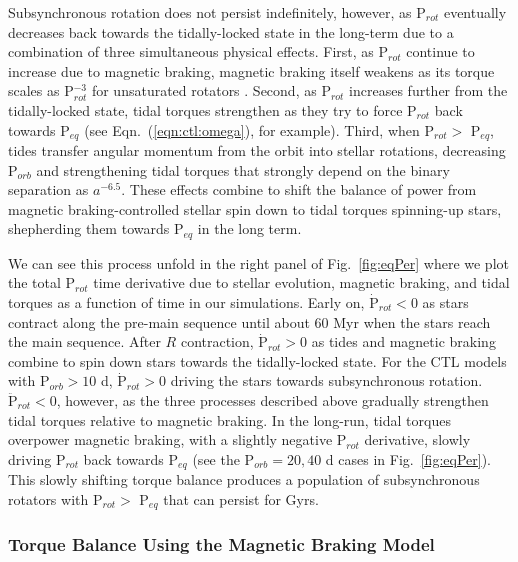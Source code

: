 \documentclass[twocolumn]{aastex61}
\begin{document}
Subsynchronous rotation does not persist indefinitely, however, as P$_{rot}$ eventually decreases back towards the tidally-locked state in the long-term due to a combination of three simultaneous physical effects.  First, as P$_{rot}$ continue to increase due to magnetic braking, magnetic braking itself weakens as its torque scales as P$_{rot}^{-3}$ for unsaturated rotators \citep{Matt2015}.  Second, as P$_{rot}$ increases further from the tidally-locked state, tidal torques strengthen as they try to force P$_{rot}$ back towards P$_{eq}$ (see Eqn.~(\ref{eqn:ctl:omega}), for example). Third, when P$_{rot} > $ P$_{eq}$, tides transfer angular momentum from the orbit into stellar rotations, decreasing P$_{orb}$ and strengthening tidal torques that strongly depend on the binary separation as $a^{-6.5}$.  These effects combine to shift the balance of power from magnetic braking-controlled stellar spin down to tidal torques spinning-up stars, shepherding them towards P$_{eq}$ in the long term. 

We can see this process unfold in the right panel of Fig.~\ref{fig:eqPer} where we plot the total P$_{rot}$ time derivative due to stellar evolution, magnetic braking, and tidal torques as a function of time in our simulations. Early on, $\dot{\mathrm{P}}_{rot} < 0$ as stars contract along the pre-main sequence until about 60 Myr when the stars reach the main sequence. After $R$ contraction, $\dot{\mathrm{P}}_{rot} > 0$ as tides and magnetic braking combine to spin down stars towards the tidally-locked state. For the CTL models with P$_{orb} > 10$ d, $\dot{\mathrm{P}}_{rot} > 0$ driving the stars towards subsynchronous rotation. $\ddot{\mathrm{P}}_{rot} < 0$, however, as the three processes described above gradually strengthen tidal torques relative to magnetic braking.  In the long-run, tidal torques overpower magnetic braking, with a slightly negative P$_{rot}$ derivative, slowly driving P$_{rot}$ back towards P$_{eq}$ (see the P$_{orb} = 20, 40$ d cases in Fig.~\ref{fig:eqPer}). This slowly shifting torque balance produces a population of subsynchronous rotators with P$_{rot} > $ P$_{eq}$ that can persist for Gyrs.  

\subsubsection{Torque Balance Using the \citet{Reiners2012} Magnetic Braking Model}
\end{document}
